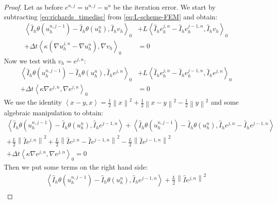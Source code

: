 \documentclass[../Main/main.tex]{subfiles}
\begin{document}
	\begin{proof}
		Let as before $e^{n,j} = u^{n,j}-u^n$ be the iteration error.
		We start by subtracting \eqref{eq:richards_timedisc} from \eqref{eq:L-scheme-FEM} and obtain:
			\begin{equation}
			\begin{aligned}
				\left \langle \hat{I}_h \theta(u^{n,j-1}_h) - \hat{I}_h \theta(u^{n}_h),\hat{I}_h v_h \right \rangle_0 &+ L \left \langle \hat{I}_h e^{j,n}_h -  \hat{I}_h e^{j-1,n}_h,\hat{I}_h v_h \right \rangle_0 \\+ \Delta t \left \langle \kappa (\nabla u^{j,n}_h-\nabla u^{n}_h),\nabla v_h \right \rangle_0 &=0 
			\end{aligned}
		\end{equation}
		Now we test with $v_h=e^{j,n}$:
		\begin{equation}
			\begin{aligned}
				\left \langle \hat{I}_h \theta(u^{n,j-1}_h) - \hat{I}_h \theta(u^{n}_h),\hat{I}_h e^{j,n} \right \rangle_0 &+ L \left \langle \hat{I}_h e^{j,n}_h -  \hat{I}_h e^{j-1,n}_h,\hat{I}_h e^{j,n} \right \rangle_0 \\+ \Delta t \left \langle \kappa\nabla e^{j,n},\nabla e^{j,n} \right \rangle_0 &=0 
			\end{aligned}
		\end{equation}
		We use the identity $\left \langle x-y,x\right \rangle = \frac{1}{2}\left \| x \right \|^2 + \frac{1}{2}\left \| x-y \right \|^2 - \frac{1}{2} \left \| y \right \|^2$ and some algebraic manipulation to obtain:
		\begin{equation}
			\begin{gathered}
					\left \langle \hat{I}_h \theta(u^{n,j-1}_h) - \hat{I}_h \theta(u^{n}_h),\hat{I}_h e^{j-1,n} \right \rangle + 	\left \langle \hat{I}_h \theta(u^{n,j-1}_h) - \hat{I}_h \theta(u^{n}_h),\hat{I}_h e^{j,n} - \hat{I}_h e^{j-1,n}\right \rangle \\
					+\frac{L}{2}\left \| \hat{I} e^{j,n}\right \|^2 + \frac{L}{2}\left \| \hat{I} e^{j,n}-\hat{I}e^{j-1,n} \right \|^2 -\frac{L}{2}\left \| \hat{I} e^{j-1,n}\right \|^2 \\
				+ \Delta t \left \langle \kappa \nabla e^{j,n},\nabla e^{j,n} \right \rangle_0 =0 
			\end{gathered}
		\end{equation}
		Then we put some terms on the right hand side:
		\begin{equation}
			\begin{gathered}
				\left \langle \hat{I}_h \theta(u^{n,j-1}_h) - \hat{I}_h \theta(u^{n}_h),\hat{I}_h e^{j-1,n} \right \rangle +\frac{L}{2}\left \| \hat{I} e^{j,n}\right \|^2 	 \\

\end{gathered}
\end{equation}
\end{proof}
\end{document}

